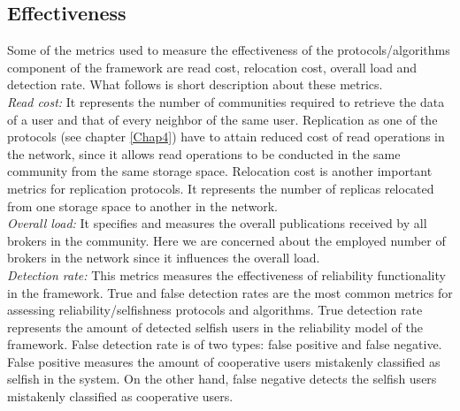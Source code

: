 \subsection{Effectiveness}\label{Chap3_03_01}
Some of the metrics used to measure the effectiveness of the protocols/algorithms component of the framework are read cost, relocation cost, overall load and detection rate. What follows is short description about these metrics.\\
\emph{Read cost:} It represents the number of communities required to retrieve the data of a user and that of every neighbor of the same user. Replication as one of the protocols (see chapter \ref{Chap4}) have to attain reduced cost of read operations in the network, since it allows read operations to be conducted in the same community from the same storage space. Relocation cost is another important metrics for replication protocols. It represents the number of replicas relocated from one storage space to another in the network. \\
\emph{Overall load:} It specifies and measures the overall publications received by all brokers in the community. Here we are concerned about the employed number of brokers in the network since it influences the overall load.\\
\emph{Detection rate:} This metrics measures the effectiveness of reliability functionality in the framework. True and false detection rates are the most common metrics for assessing reliability/selfishness protocols and algorithms. True detection rate represents the amount of detected selfish users in the reliability model of the framework. False detection rate is of two types: false positive and false negative. False positive measures the amount of cooperative users mistakenly classified as selfish in the system. On the other hand, false negative detects the selfish users mistakenly classified as cooperative users. \\

